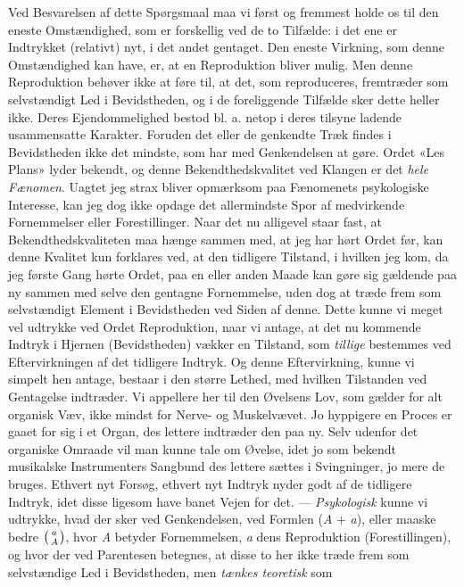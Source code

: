 \documentclass[12pt,a4paper,openany]{book}
\newcommand{\opage}[1]{\marginnote{\footnotesize\textit{[#1]}}}
\begin{document}
Ved Besvarelsen af dette Spørgsmaal maa vi først og fremmest holde os til den
eneste Omstændighed, som er forskellig ved de to Tilfælde: i det ene er
Indtrykket (relativt) nyt, i det andet gentaget. Den eneste Virkning, som denne
Omstændighed kan have, er, at en Reproduktion bliver mulig. Men denne
Reproduktion behøver ikke at føre til, at det, som reproduceres, fremtræder som
selvstændigt Led i Bevidstheden, og i de foreliggende Tilfælde sker dette
heller ikke. Deres Ejendommelighed bestod bl. a. netop i deres tilsyne%
\setcounter{footnote}{0}%
\opage{12}ladende usammensatte Karakter. Foruden det eller de genkendte Træk
findes i Bevidstheden ikke det mindste, som har med Genkendelsen at gøre. Ordet
«Les Plans» lyder bekendt, og denne Bekendthedskvalitet ved Klangen er det
\emph{hele Fænomen}. Uagtet jeg strax bliver opmærksom paa Fænomenets
psykologiske Interesse, kan jeg dog ikke opdage det allermindste Spor af
medvirkende Fornemmelser eller Forestillinger. Naar det nu alligevel staar
fast, at Bekendthedskvaliteten maa hænge sammen med, at jeg har hørt Ordet før,
kan denne Kvalitet kun forklares ved, at den tidligere Tilstand, i hvilken jeg
kom, da jeg første Gang hørte Ordet, paa en eller anden Maade kan gøre sig
gældende paa ny sammen med selve den gentagne Fornemmelse, uden dog at træde
frem som selvstændigt Element i Bevidstheden ved Siden af denne. Dette kunne vi
meget vel udtrykke ved Ordet Reproduktion, naar vi antage, at det nu kommende
Indtryk i Hjernen (Bevidstheden) vækker en Tilstand, som \emph{tillige}
bestemmes ved Eftervirkningen af det tidligere Indtryk. Og denne Eftervirkning,
kunne vi simpelt hen antage, bestaar i den større Lethed, med hvilken
Tilstanden ved Gentagelse indtræder. Vi appellere her til den Øvelsens Lov, som
gælder for alt organisk Væv, ikke mindst for Nerve- og Muskelvævet. Jo
hyppigere en Proces er gaaet for sig i et Organ, des lettere indtræder den paa
ny. Selv udenfor det organiske Omraade vil man kunne tale om Øvelse, idet jo
som bekendt musikalske Instrumenters Sangbund des lettere sættes i Svingninger,
jo mere de bruges. Ethvert nyt Forsøg, ethvert nyt Indtryk nyder godt af de
tidligere Indtryk, idet disse ligesom have banet Vejen for det. ---
\emph{Psykologisk} kunne vi udtrykke, hvad der sker ved Genkendelsen, ved
Formlen (\textit{A} + \textit{a}), eller maaske bedre $\left({a\atop
A}\right)$, hvor \textit{A} betyder Fornemmelsen, \textit{a} dens Reproduktion
(Forestillingen), og hvor der ved Parentesen betegnes, at disse to her ikke
træde frem som selvstændige Led i Bevidstheden, men \emph{tænkes teoretisk} som
\end{document}
